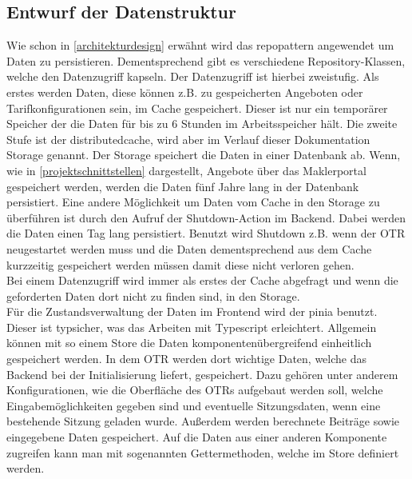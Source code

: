 \subsection{Entwurf der Datenstruktur}
\label{datenmodell}
Wie schon in \ref{architekturdesign}  erwähnt wird das \gls{repopattern} angewendet um Daten zu persistieren. Dementsprechend gibt es verschiedene Repository-Klassen, welche den Datenzugriff kapseln. Der Datenzugriff ist hierbei zweistufig. Als erstes werden Daten, diese können z.B. zu gespeicherten Angeboten oder Tarifkonfigurationen sein, im Cache gespeichert. Dieser ist nur ein temporärer Speicher der die Daten für bis zu 6 Stunden im Arbeitsspeicher hält. Die zweite Stufe ist der \gls{distributedcache}, wird aber im Verlauf dieser Dokumentation Storage genannt. Der Storage speichert die Daten in einer Datenbank ab.
Wenn, wie in \ref{projektschnittstellen}  dargestellt, Angebote über das Maklerportal gespeichert werden, werden die Daten fünf Jahre lang in der Datenbank persistiert. Eine andere Möglichkeit um Daten vom Cache in den Storage zu überführen ist durch den Aufruf der Shutdown-Action im Backend. Dabei werden die Daten einen Tag lang persistiert. Benutzt wird Shutdown z.B. wenn der \ac{OTR} neugestartet werden muss und die Daten dementsprechend aus dem Cache kurzzeitig gespeichert werden müssen damit diese nicht verloren gehen.\\
Bei einem Datenzugriff wird immer als erstes der Cache abgefragt und wenn die geforderten Daten dort nicht zu finden sind, in den Storage.\\
Für die Zustandsverwaltung der Daten im Frontend wird der \gls{pinia} benutzt. Dieser ist typsicher, was das Arbeiten mit Typescript erleichtert. Allgemein können mit so einem Store die Daten komponentenübergreifend einheitlich gespeichert werden. In dem \ac{OTR} werden dort wichtige Daten, welche das Backend bei der Initialisierung liefert, gespeichert. Dazu gehören unter anderem Konfigurationen, wie die Oberfläche des \ac{OTR}s aufgebaut werden soll, welche Eingabemöglichkeiten gegeben sind und eventuelle Sitzungsdaten, wenn eine bestehende Sitzung geladen wurde. Außerdem werden berechnete Beiträge sowie eingegebene Daten gespeichert. Auf die Daten aus einer anderen Komponente zugreifen kann man mit sogenannten Gettermethoden, welche im Store definiert werden.
